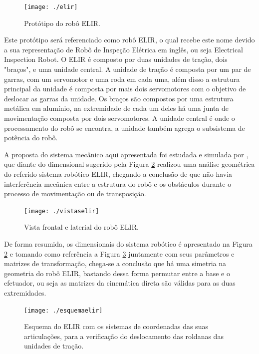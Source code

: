 \begin{figure} [h!]	
	\caption{Protótipo do robô ELIR.}
	\label{img:elir}											 
	\centering													 
	\texttt{[image: ./elir]}
\end{figure}													 

Este protótipo será referenciado como robô ELIR, o qual recebe este nome devido a sua representação de Robô de Inspeção Elétrica em inglês, ou seja Electrical Inspection Robot. O ELIR é composto por duas unidades de tração, dois "braços", e uma unidade central. A unidade de tração é composta por um par de garras, com um servomotor e uma roda em cada uma, além disso a estrutura principal da unidade é composta por mais dois servomotores com o objetivo de deslocar as garras da unidade. Os braços são compostos por uma estrutura metálica em alumínio, na extremidade de cada um deles há uma junta de movimentação composta por dois servomotores. A unidade central é onde o processamento do robô se encontra, a unidade também agrega o subsistema de potência do robô.

A proposta do sistema mecânico aqui apresentada foi estudada e simulada por , que diante do dimensional sugerido pela Figura \ref{img:vistaselir} realizou uma análise geométrica do referido sistema robótico ELIR, chegando a conclusão de que não havia interferência mecânica entre a estrutura do robô e os obstáculos durante o processo de movimentação ou de transposição.

\begin{figure} [h!]	
	\caption{Vista frontal e laterial do robô ELIR.}
	\label{img:vistaselir}											 
	\centering													 
	\texttt{[image: ./vistaselir]}
\end{figure}													 

 De forma resumida, os dimensionais do sistema robótico é apresentado na Figura \ref{img:vistaselir} e tomando como referência a Figura \ref{img:esquemaelir} juntamente com seus parâmetros e matrizes de transformação, chega-se a conclusão que há uma simetria na geometria do robô ELIR, bastando dessa forma permutar entre a base e o efetuador, ou seja as matrizes da cinemática direta são válidas para as duas extremidades.

\begin{figure} [h!]	
	\caption{Esquema do ELIR  com os sistemas de coordenadas das suas articulações, para a verificação do deslocamento das roldanas das unidades de tração.}
	\label{img:esquemaelir}											 
	\centering													 
	\texttt{[image: ./esquemaelir]}
\end{figure}													 

